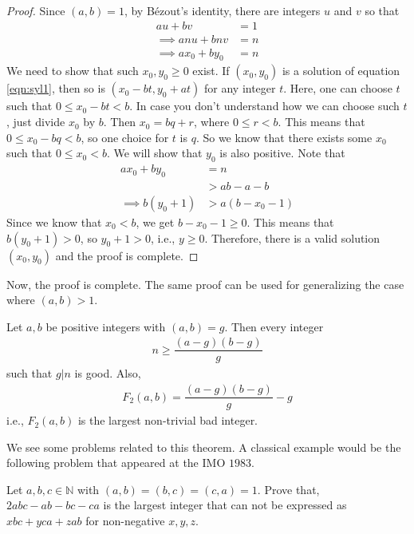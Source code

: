 	\begin{proof}
		Since $(a,b)=1$, by B\'{e}zout's identity, there are integers $u$ and $v$ so that
			\begin{align}
				au+bv
					& = 1\\
				\implies anu+bnv
					& = n\nonumber\\
				\implies ax_0+by_0
					& = n\label{eqn:syl1}
			\end{align}
		We need to show that such $x_0,y_0 \geq 0$ exist. If $(x_0,y_0)$ is a solution of equation \eqref{eqn:syl1}, then so is $(x_0-bt,y_0+at)$ for any integer $t$. Here, one can choose $t$ such that $0 \leq x_0-bt<b$. In case you don't understand how we can choose such $t$, just divide $x_0$ by $b$. Then $x_0=bq+r$, where $0\leq r <b$. This means that $0 \leq x_0 -bq <b$, so one choice for $t$ is $q$. So we know that there exists some $x_0$ such that $0 \leq x_0<b$. We will show that $y_0$ is also positive. Note that
			\begin{align*}
				ax_0+by_0
					& = n\\
					& > ab-a-b\\
				\implies b(y_0+1)
					& > a(b-x_0-1)
			\end{align*}
		Since we know that $x_0<b$, we get $b-x_0-1\geq 0$. This means that $b(y_0+1) >0$, so $y_0+1>0$, i.e., $y\geq0$. Therefore, there is a valid solution $(x_0,y_0)$ and the proof is complete.
	\end{proof}
Now, the proof is complete. The same proof can be used for generalizing the case where $(a,b)>1$.
	\begin{theorem}
		Let $a,b$ be positive integers with $(a,b)=g$. Then every integer
			\begin{align*}
				n\geq\dfrac{(a-g)(b-g)}{g}
			\end{align*}
		such that $g|n$ is good. Also,
			\begin{align*}
				F_2(a,b)=\dfrac{(a-g)(b-g)}{g}-g
			\end{align*}
		i.e., $F_2(a,b)$ is the largest non-trivial bad integer.
	\end{theorem}

We see some problems related to this theorem. A classical example would be the following problem that appeared at the IMO $1983$.
	\begin{problem}[IMO 1983]
		Let $a,b,c\in\mathbb{N}$ with $(a,b)=(b,c)=(c,a)=1$. Prove that, $2abc-ab-bc-ca$ is the largest integer that can not be expressed as $xbc+yca+zab$ for non-negative $x,y,z$.
	\end{problem}

